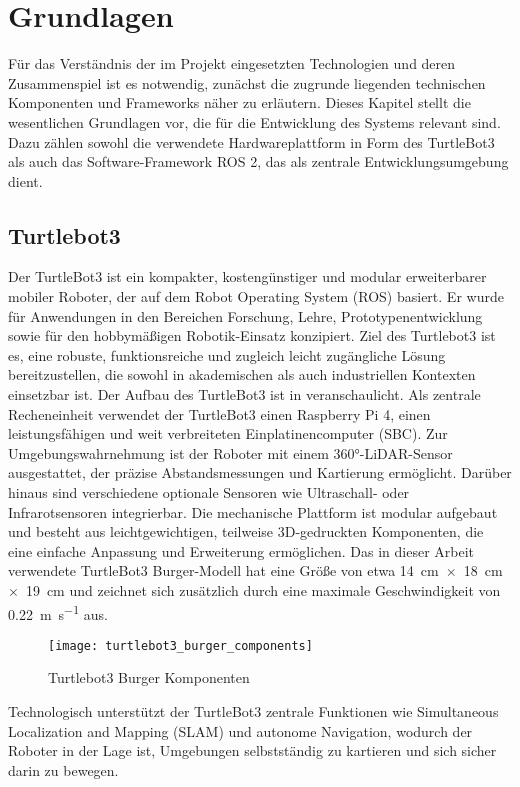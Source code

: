 \section{Grundlagen}
Für das Verständnis der im Projekt eingesetzten Technologien und deren Zusammenspiel ist es notwendig, zunächst die zugrunde liegenden technischen Komponenten und Frameworks näher zu erläutern. 
Dieses Kapitel stellt die wesentlichen Grundlagen vor, die für die Entwicklung des Systems relevant sind. 
Dazu zählen sowohl die verwendete Hardwareplattform in Form des TurtleBot3 als auch das Software-Framework ROS 2, das als zentrale Entwicklungsumgebung dient. 
\subsection{Turtlebot3}
Der TurtleBot3 ist ein kompakter, kostengünstiger und modular erweiterbarer mobiler Roboter, der auf dem Robot Operating System (ROS) basiert. 
Er wurde für Anwendungen in den Bereichen Forschung, Lehre, Prototypenentwicklung sowie für den hobbymäßigen Robotik-Einsatz konzipiert. 
Ziel des Turtlebot3 ist es, eine robuste, funktionsreiche und zugleich leicht zugängliche Lösung bereitzustellen, die sowohl in akademischen als auch industriellen Kontexten einsetzbar ist.
\cite{tb3_overview}\cite{tb3_home}
\newPar
Der Aufbau des TurtleBot3 ist in  veranschaulicht.
Als zentrale Recheneinheit verwendet der TurtleBot3 einen Raspberry Pi 4, einen leistungsfähigen und weit verbreiteten Einplatinencomputer (SBC).
Zur Umgebungswahrnehmung ist der Roboter mit einem 360°-LiDAR-Sensor ausgestattet, der präzise Abstandsmessungen und Kartierung ermöglicht. 
Darüber hinaus sind verschiedene optionale Sensoren wie Ultraschall- oder Infrarotsensoren integrierbar. 
Die mechanische Plattform ist modular aufgebaut und besteht aus leichtgewichtigen, teilweise 3D-gedruckten Komponenten, die eine einfache Anpassung und Erweiterung ermöglichen.
Das in dieser Arbeit verwendete TurtleBot3 Burger-Modell hat eine Größe von etwa \SI{14}{\centi\meter}~$\times$~\SI{18}{\centi\meter}~$\times$~\SI{19}{\centi\meter} und zeichnet sich zusätzlich durch eine maximale Geschwindigkeit von \SI{0,22}{\meter\per\second} aus.
\cite{tb3_specifications}\cite{tb3_overview}
\newPar
\begin{figure}[H]
    \centering
    \texttt{[image: turtlebot3\_burger\_components]}
    \caption{Turtlebot3 Burger Komponenten \cite{tb3_specifications}}\label{tb3_components}
\end{figure}
Technologisch unterstützt der TurtleBot3 zentrale Funktionen wie Simultaneous Localization and Mapping (SLAM) und autonome Navigation, wodurch der Roboter in der Lage ist, Umgebungen selbstständig zu kartieren und sich sicher darin zu bewegen. 
